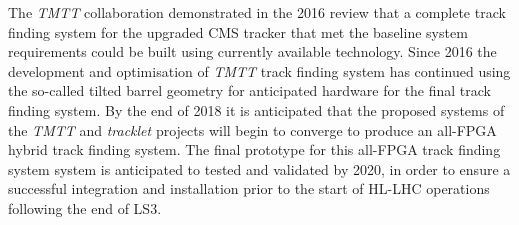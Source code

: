 The \emph{TMTT} collaboration demonstrated in the 2016 review that a complete track finding system for the upgraded CMS tracker that met the baseline system requirements could be built using currently available technology.
Since 2016 the development and optimisation of \emph{TMTT} track finding system has continued using the so-called tilted barrel geometry for anticipated hardware for the final track finding system.
By the end of 2018 it is anticipated that the proposed systems of the \emph{TMTT} and \emph{tracklet} projects will begin to converge to produce an all-FPGA hybrid track finding system.
The final prototype for this all-FPGA track finding system system is anticipated to tested and validated by 2020, in order to ensure a successful integration and installation prior to the start of HL-LHC operations following the end of LS3.

%
